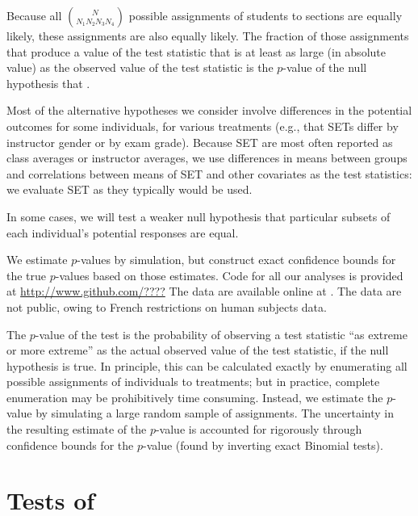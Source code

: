 \documentclass[12pt]{article}
\newcommand{\todo}[1]{{\color{red}{TO DO: \sc #1}}}
\begin{document}
Because all ${N}\choose{N_1 N_2 N_3 N_4}$ possible assignments of students
to sections are equally likely, these assignments are also equally likely.
The fraction of those assignments that produce a value of the test statistic that
is at least as large (in absolute value) as the observed value of the test statistic
is the $p$-value of the null hypothesis that \todo{fix}.

\todo{conditioning: argument.}

\todo{one more complication: have to assume under the null that the same students
would not have submitted SET, regardless of which section they were in (if assigned to the
same instructor)}



Most of the alternative hypotheses we consider involve
differences in the potential outcomes for some individuals, for various treatments 
(e.g., that SETs differ by instructor gender or by exam grade). 
Because SET are most often reported as class averages or instructor averages, 
we use differences in means between groups and 
correlations between means of SET and other covariates as the test statistics:
we evaluate SET as they typically would be used.


In some cases, we will test a weaker null hypothesis that particular subsets of each individual's
potential responses are equal.


We estimate $p$-values by simulation, but construct exact confidence bounds for the true
$p$-values based on those estimates.
Code for all our analyses is provided at \url{http://www.github.com/????} \todo{Fix!}
The \cite{MacNell2014} data are available online at \todo{Fix!}.
The \cite{Boring2015} data are not public, owing to French restrictions on human subjects data.

The $p$-value of the test is the probability 
of observing a test statistic ``as 
extreme or more extreme'' as the actual observed value of the test statistic,
if the null hypothesis is true.
In principle, this can be calculated exactly by enumerating all possible
assignments of individuals to treatments; but
in practice, complete enumeration may be prohibitively time consuming. 
Instead, we estimate the $p$-value by simulating a large random sample of assignments.  
The uncertainty in the resulting estimate of the $p$-value is accounted for rigorously through
confidence bounds for the $p$-value (found by inverting exact Binomial tests).


\section{Tests of \citet{Boring2015}}
\end{document}
